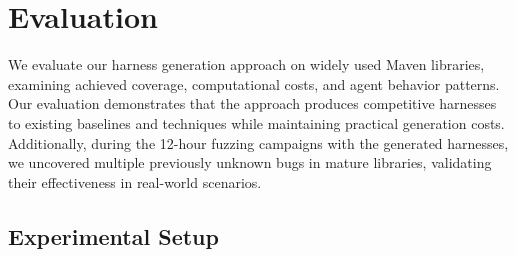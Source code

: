 
\section{Evaluation}%
\label{sec:evaluation}

We evaluate our harness generation approach on widely used Maven libraries, examining achieved coverage, computational costs, and agent behavior patterns. Our evaluation demonstrates that the approach produces competitive harnesses to existing baselines and techniques while maintaining practical generation costs. Additionally, during the 12-hour fuzzing campaigns with the generated harnesses, we uncovered multiple previously unknown bugs in mature libraries, validating their effectiveness in real-world scenarios.

\subsection{Experimental Setup}%
\label{subsec:exp-setup}

